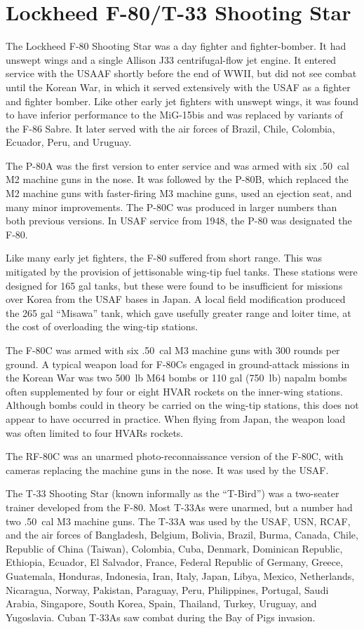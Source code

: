 \section{Lockheed F-80/T-33 Shooting Star}

The Lockheed F-80 Shooting Star was a day fighter and fighter-bomber. It had unswept wings and a single Allison J33 centrifugal-flow jet engine. It entered service with the USAAF shortly before the end of WWII, but did not see combat until the Korean War, in which it served extensively with the USAF as a fighter and fighter bomber. Like other early jet fighters with unswept wings, it was found to have inferior performance to the MiG-15bis and was replaced by variants of the F-86 Sabre. It later served with the air forces of Brazil, Chile, Colombia, Ecuador, Peru, and Uruguay.

The P-80A was the first version to enter service and was armed with six .50~cal M2 machine guns in the nose. It was followed by the P-80B, which replaced the M2 machine guns with faster-firing M3 machine guns, used an ejection seat, and many minor improvements. The P-80C was produced in larger numbers than both previous versions. In USAF service from 1948, the P-80 was designated the F-80.

Like many early jet fighters, the F-80 suffered from short range. This was mitigated by the provision of jettisonable wing-tip fuel tanks. These stations were designed for 165 gal tanks, but these were found to be insufficient for missions over Korea from the USAF bases in Japan. A local field modification produced the 265 gal “Misawa” tank, which gave usefully greater range and loiter time, at the cost of overloading the wing-tip stations.

The F-80C was armed with six .50~cal M3 machine guns with 300 rounds per ground. A typical weapon load for F-80Cs engaged in ground-attack missions in the Korean War was two 500~lb M64 bombs or 110 gal (750~lb) napalm bombs often supplemented by four or eight HVAR rockets on the inner-wing stations. Although bombs could in theory be carried on the wing-tip stations, this does not appear to have occurred in practice. When flying from Japan, the weapon load was often limited to four HVARs rockets.

The RF-80C was an unarmed photo-reconnaissance version of the F-80C, with cameras replacing the machine guns in the nose. It was used by the USAF.

The T-33 Shooting Star (known informally as the “T-Bird”) was a two-seater trainer developed from the F-80. Most T-33As were unarmed, but a number had two .50~cal M3 machine guns. The T-33A was used by the USAF, USN, RCAF, and the air forces of Bangladesh, Belgium, Bolivia, Brazil, Burma, Canada, Chile, Republic of China (Taiwan), Colombia, Cuba, Denmark, Dominican Republic, Ethiopia, Ecuador, El Salvador, France, Federal Republic of Germany, Greece, Guatemala, Honduras, Indonesia, Iran, Italy, Japan, Libya, Mexico, Netherlands, Nicaragua, Norway, Pakistan, Paraguay, Peru, Philippines, Portugal, Saudi Arabia, Singapore, South Korea, Spain, Thailand, Turkey, Uruguay, and Yugoslavia. Cuban T-33As saw combat during the Bay of Pigs invasion.

